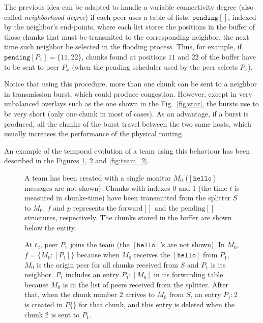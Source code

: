 The previous idea can be adapted to handle a variable connectivity
degree (also called \emph{neighborhood degree}) if each peer uses a
table of lists, $\mathtt{pending}[]$, indexed by the neighbor's
end-points, where each list stores the positions in the buffer of
those chunks that must be transmited to the corresponding neighbor,
the next time such neighbor be selected in the flooding process. Thus,
for example, if $\mathtt{pending}[P_x]=\{11,22\}$, chunks found at
positions $11$ and $22$ of the buffer have to be sent to peer $P_x$
(when the pending scheduler used by the peer selects $P_x$).

Notice that using this procedure, more than one chunk can be sent to a
neighbor in transmission burst, which could produce
congestion. However, except in very unbalanced overlays such as the
one shown in the Fig.~\ref{fig:star}, the bursts use to be very short
(only one chunk in most of cases). As an advantage, if a burst is
produced, all the chunks of the burst travel between the two same
hosts, which usually increases the performance of the physical
routing.

An example of the temporal evolution of a team using this behaviour
has been described in the Figures \ref{fig:team_0}, \ref{fig:team_1}
and \ref{fig:team_2}.

\begin{figure}
   \caption{A team has been created with a
    single monitor $M_0$ ($[\mathtt{hello}]$ messages are not
    shown). Chunks with indexes 0 and 1 (the time $t$ is measured in
    chunks-time) have been transmitted from the splitter $S$ to
    $M_0$. $f$ and $p$ represents the $\text{forward}[]$ and the
    $\text{pending}[]$ structures, respectively. The chunks stored in
    the buffer are shown below the entity.\label{fig:team_0}}
\end{figure}

\begin{figure}
   \caption{At $t_2$, peer $P_1$ joins
    the team (the $[\mathtt{hello}]$'s are not shown). In $M_0$,
    $f=\{M_0:[P_1]\}$ because when $M_0$ receives the
    $[\mathtt{hello}]$ from $P_1$, $M_0$ is the origin peer for all
    chunks received from $S$ and $P_1$ is its neighbor. $P_1$ includes
    an entry $P_1:[M_0]$ in its forwarding table because $M_0$ is in
    the list of peers received from the splitter. After that, when the
    chunk number 2 arrives to $M_0$ from $S$, an entry $P_1:2$ is
    created in $P\{\}$ for that chunk, and this entry is deleted when
    the chunk 2 is sent to $P_1$.\label{fig:team_1}}
\end{figure}

